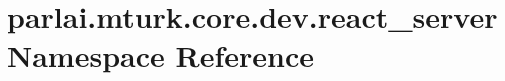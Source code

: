 \hypertarget{namespaceparlai_1_1mturk_1_1core_1_1dev_1_1react__server}{}\section{parlai.\+mturk.\+core.\+dev.\+react\+\_\+server Namespace Reference}
\label{namespaceparlai_1_1mturk_1_1core_1_1dev_1_1react__server}
